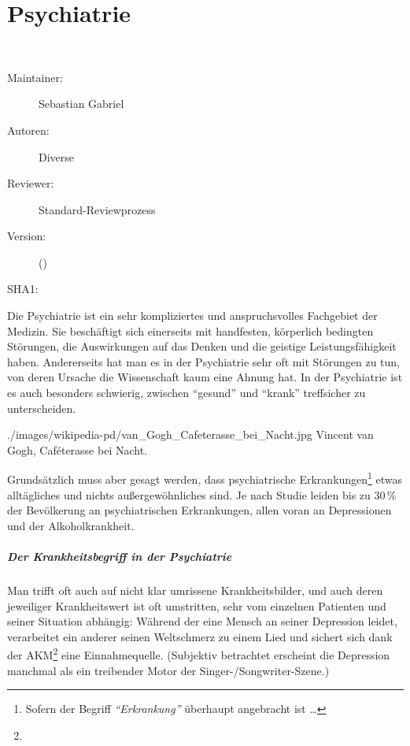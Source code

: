 \def\ChapterCode{PSY}
\chapter
[\CO{[PSY]} Psychiatrie]
{Psychiatrie}
\label{chp:PSY}

\ChapterIntro
{%
~~~
}
{%
\begin{description}
  \item[Maintainer:] Sebastian Gabriel
  \item[Autoren:] Diverse
  \item[Reviewer:] Standard-Reviewprozess
  \item[Version:] {\DocVersion} ({\DocVersionInfo})
  \item[SHA1:] {\DocGitCommit}
\end{description}

{\TxTeilkapitelAASS}
}


\nocite{WunnPsych1,OHCSP7}
\label{topic:unterbringungsgesetz}


{%
Die Psychiatrie ist ein sehr kompliziertes und
anspruchsvolles Fachgebiet der Medizin. Sie beschäftigt
sich einerseits mit handfesten, körperlich bedingten
Störungen, die Auswirkungen auf das Denken und die geistige
Leistungsfähigkeit haben. Andererseits hat man es in der
Psychiatrie sehr oft mit Störungen zu tun, von deren
Ursache die Wissenschaft kaum eine Ahnung hat. In der
Psychiatrie ist es auch besonders schwierig, zwischen
\enquote{gesund} und \enquote{krank} treffsicher zu unterscheiden. 
}{

}
{./images/wikipedia-pd/van_Gogh_Cafeterasse_bei_Nacht.jpg}
{Vincent van Gogh, Caféterasse bei Nacht.}{}


Grundsätzlich muss aber gesagt werden, dass psychiatrische
Erkrankungen\footnote{Sofern der Begriff
\emph{\enquote{Erkrankung}} überhaupt angebracht ist \ldots}
etwas alltägliches und nichts außergewöhnliches sind. Je
nach Studie leiden bis zu 30\,\% der Bevölkerung an
psychiatrischen Erkrankungen, allen voran an Depressionen
und der Alkoholkrankheit.



\paragraph{Der {Krankheitsbegriff} in der Psychiatrie} Man
trifft oft auch auf nicht klar umrissene Krankheitsbilder, und
auch deren jeweiliger Krankheitswert ist oft umstritten,
sehr vom einzelnen Patienten und seiner Situation abhängig:
Während der eine Mensch an seiner Depression leidet,
verarbeitet ein anderer seinen Weltschmerz zu einem Lied und
sichert sich dank der AKM\footnote{} eine
Einnahmequelle. (Subjektiv betrachtet erscheint die
Depression manchmal als ein treibender Motor der
Singer-/Songwriter-Szene.)




